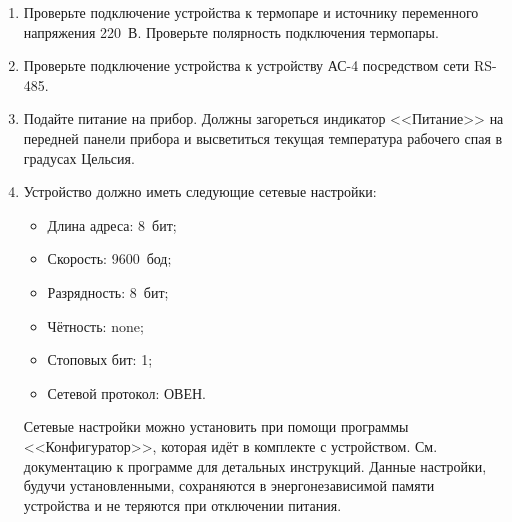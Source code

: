 \begin{enumerate}

\item Проверьте подключение устройства к термопаре и источнику переменного напряжения 220~В. Проверьте полярность подключения термопары.

\item Проверьте подключение устройства к устройству АС-4 посредством сети RS-485.

\item Подайте питание на прибор. Должны загореться индикатор <<Питание>> на передней панели прибора и высветиться текущая температура рабочего спая в градусах Цельсия.

\item Устройство должно иметь следующие сетевые настройки:

\begin{itemize}
\item Длина адреса: 8~бит;
\item Скорость: 9600~бод;
\item Разрядность: 8~бит;
\item Чётность: none;
\item Стоповых бит: 1;
\item Сетевой протокол: ОВЕН.
\end{itemize}

Сетевые настройки можно установить при помощи программы <<Конфигуратор>>, которая идёт в комплекте с устройством. См. документацию к программе для детальных инструкций. Данные настройки, будучи установленными, сохраняются в энергонезависимой памяти устройства и не теряются при отключении питания.

\end{enumerate}
